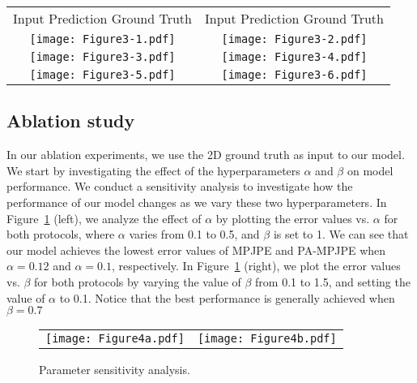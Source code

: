 \documentclass{bmvc2k}
\begin{document}
\begin{figure*}[!htb]
\centering
\setlength{\tabcolsep}{7pt}
\begin{tabular}{cc}
\hspace*{.25in} Input\hspace*{.2in} Prediction\hspace*{.1in} Ground Truth & \hspace*{.25in} Input\hspace*{.25in} Prediction\hspace*{.1in} Ground Truth \\
\texttt{[image: Figure3-1.pdf]} & \texttt{[image: Figure3-2.pdf]}\\
\texttt{[image: Figure3-3.pdf]} & \texttt{[image: Figure3-4.pdf]}\\
\texttt{[image: Figure3-5.pdf]} & \texttt{[image: Figure3-6.pdf]}
\end{tabular}
\caption{Qualitative results obtained by our model on the Human3.6M test set.}
\label{Fig:visual}
\end{figure*}

\subsection{Ablation study}
In our ablation experiments, we use the 2D ground truth as input to our model. We start by investigating the effect of the hyperparameters $\alpha$ and $\beta$ on model performance. We conduct a sensitivity analysis to investigate how the performance of our model changes as we vary these two hyperparameters. In Figure~\ref{Fig:alphabeta} (left), we analyze the effect of $\alpha$ by plotting the error values vs. $\alpha$ for both protocols, where $\alpha$ varies from 0.1 to 0.5, and $\beta$ is set to 1. We can see that our model achieves the lowest error values of MPJPE and PA-MPJPE when $\alpha=0.12$ and $\alpha=0.1$, respectively. In Figure~\ref{Fig:alphabeta} (right), we plot the error values vs. $\beta$ for both protocols by varying the value of $\beta$ from 0.1 to 1.5, and setting the value of $\alpha$ to 0.1. Notice that the best performance is generally achieved when $\beta=0.7$

\begin{figure}[!htb]
\centering
\setlength{\tabcolsep}{5pt}
\begin{tabular}{cc}
\texttt{[image: Figure4a.pdf]} & \texttt{[image: Figure4b.pdf]}
\end{tabular}
\caption{Parameter sensitivity analysis.}
\label{Fig:alphabeta}
\end{figure}
\end{document}
